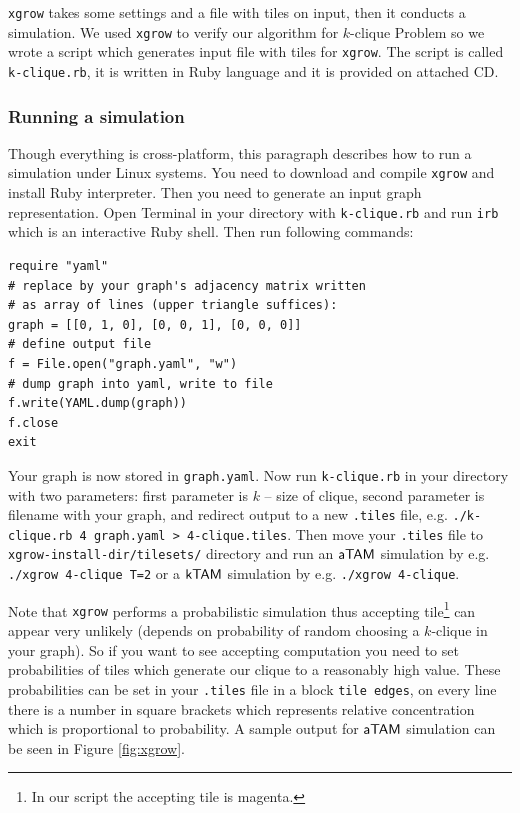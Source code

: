 {\tt xgrow} takes some settings and a file with tiles on input, then it conducts a simulation. We used {\tt xgrow} to verify our algorithm for $k$-clique Problem so we wrote a script which generates input file with tiles for {\tt xgrow}. The script is called {\tt k-clique.rb}, it is written in Ruby language and it is provided on attached CD.

\subsubsection*{Running a simulation}

Though everything is cross-platform, this paragraph describes how to run a simulation under Linux systems. You need to download and compile {\tt xgrow} and install Ruby interpreter. Then you need to generate an input graph representation. Open Terminal in your directory with {\tt k-clique.rb} and run {\tt irb} which is an interactive Ruby shell. Then run following commands:
\begin{verbatim}
require "yaml"
# replace by your graph's adjacency matrix written
# as array of lines (upper triangle suffices):
graph = [[0, 1, 0], [0, 0, 1], [0, 0, 0]]
# define output file
f = File.open("graph.yaml", "w")
# dump graph into yaml, write to file
f.write(YAML.dump(graph))
f.close
exit
\end{verbatim}
Your graph is now stored in {\tt graph.yaml}. Now run {\tt k-clique.rb} in your directory with two parameters: first parameter is $k$ -- size of clique, second parameter is filename with your graph, and redirect output to a new {\tt *.tiles} file, e.g. {\tt ./k-clique.rb 4 graph.yaml > 4-clique.tiles}. Then move your {\tt *.tiles} file to {\tt xgrow-install-dir/tilesets/} directory and run an $\mathsf{aTAM}$ simulation by e.g. {\tt ./xgrow 4-clique T=2} or a $\mathsf{kTAM}$ simulation by e.g. {\tt ./xgrow 4-clique}.

Note that {\tt xgrow} performs a probabilistic simulation thus accepting tile\footnote{In our script the accepting tile is magenta.} can appear very unlikely (depends on probability of random choosing a $k$-clique in your graph). So if you want to see accepting computation you need to set probabilities of tiles which generate our clique to a reasonably high value. These probabilities can be set in your {\tt *.tiles} file in a block {\tt tile edges}, on every line there is a number in square brackets which represents relative concentration which is proportional to probability. A sample output for $\mathsf{aTAM}$ simulation can be seen in Figure \ref{fig:xgrow}.

